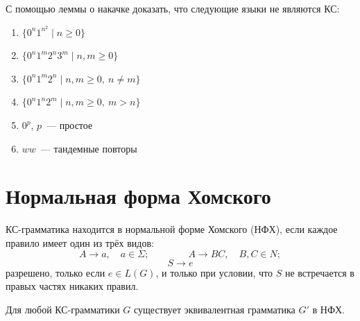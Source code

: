 \documentclass[12pt]{article}
\begin{document}
    \begin{problem}
    	С помощью леммы о накачке доказать, что следующие языки не являются КС:
    	\begin{enumerate}
    		\item $\{ 0^n1^{n^2} \mid n \geqslant 0 \}$
    		\item $\{ 0^n1^m2^n3^m \mid n, m \geqslant 0 \}$
    		\item $\{ 0^n1^m2^n \mid n, m \geqslant 0,\ n \neq m \}$
    		\item $\{ 0^n1^n2^m \mid n, m \geqslant 0,\ m > n \}$
			\item $0^p$, $p$~--- простое
			\item $ww$~--- тандемные повторы
    	\end{enumerate}
    \end{problem}
    
    \section{Нормальная форма Хомского}
    
    \begin{definition}
    	КС-грамматика находится в нормальной форме Хомского (НФХ), если каждое правило имеет один из трёх видов:
    	\[
    	A \rightarrow a, \quad a \in \Sigma; \qquad\qquad A \rightarrow BC, \quad B, C \in N;
    	\]
    	\[
    	S \rightarrow e
    	\]
		разрешено, только если $e \in L(G)$, и только при условии, что $S$ не встречается в правых частях никаких правил.
    \end{definition}
    
    \begin{theorem}
    	Для любой КС-грамматики $G$ существует эквивалентная грамматика $G'$ в НФХ.
    \end{theorem}
    
\end{document}

